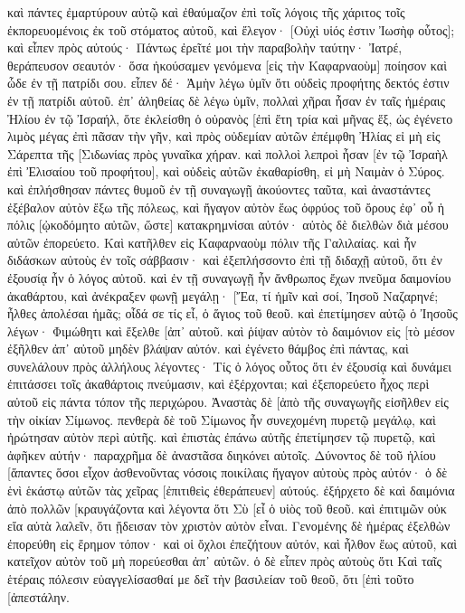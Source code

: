 καὶ πάντες ἐμαρτύρουν αὐτῷ καὶ ἐθαύμαζον ἐπὶ τοῖς λόγοις τῆς χάριτος τοῖς ἐκπορευομένοις ἐκ τοῦ στόματος αὐτοῦ, καὶ ἔλεγον· [Οὐχὶ υἱός ἐστιν Ἰωσὴφ οὗτος]; 
καὶ εἶπεν πρὸς αὐτούς· Πάντως ἐρεῖτέ μοι τὴν παραβολὴν ταύτην· Ἰατρέ, θεράπευσον σεαυτόν· ὅσα ἠκούσαμεν γενόμενα [εἰς τὴν Καφαρναοὺμ] ποίησον καὶ ὧδε ἐν τῇ πατρίδι σου. 
εἶπεν δέ· Ἀμὴν λέγω ὑμῖν ὅτι οὐδεὶς προφήτης δεκτός ἐστιν ἐν τῇ πατρίδι αὐτοῦ. 
ἐπ᾽ ἀληθείας δὲ λέγω ὑμῖν, πολλαὶ χῆραι ἦσαν ἐν ταῖς ἡμέραις Ἠλίου ἐν τῷ Ἰσραήλ, ὅτε ἐκλείσθη ὁ οὐρανὸς [ἐπὶ ἔτη τρία καὶ μῆνας ἕξ, ὡς ἐγένετο λιμὸς μέγας ἐπὶ πᾶσαν τὴν γῆν, 
καὶ πρὸς οὐδεμίαν αὐτῶν ἐπέμφθη Ἠλίας εἰ μὴ εἰς Σάρεπτα τῆς [Σιδωνίας πρὸς γυναῖκα χήραν. 
καὶ πολλοὶ λεπροὶ ἦσαν [ἐν τῷ Ἰσραὴλ ἐπὶ Ἐλισαίου τοῦ προφήτου], καὶ οὐδεὶς αὐτῶν ἐκαθαρίσθη, εἰ μὴ Ναιμὰν ὁ Σύρος. 
καὶ ἐπλήσθησαν πάντες θυμοῦ ἐν τῇ συναγωγῇ ἀκούοντες ταῦτα, 
καὶ ἀναστάντες ἐξέβαλον αὐτὸν ἔξω τῆς πόλεως, καὶ ἤγαγον αὐτὸν ἕως ὀφρύος τοῦ ὄρους ἐφ᾽ οὗ ἡ πόλις [ᾠκοδόμητο αὐτῶν, ὥστε] κατακρημνίσαι αὐτόν· 
αὐτὸς δὲ διελθὼν διὰ μέσου αὐτῶν ἐπορεύετο. 
Καὶ κατῆλθεν εἰς Καφαρναοὺμ πόλιν τῆς Γαλιλαίας. καὶ ἦν διδάσκων αὐτοὺς ἐν τοῖς σάββασιν· 
καὶ ἐξεπλήσσοντο ἐπὶ τῇ διδαχῇ αὐτοῦ, ὅτι ἐν ἐξουσίᾳ ἦν ὁ λόγος αὐτοῦ. 
καὶ ἐν τῇ συναγωγῇ ἦν ἄνθρωπος ἔχων πνεῦμα δαιμονίου ἀκαθάρτου, καὶ ἀνέκραξεν φωνῇ μεγάλῃ· 
[Ἔα, τί ἡμῖν καὶ σοί, Ἰησοῦ Ναζαρηνέ; ἦλθες ἀπολέσαι ἡμᾶς; οἶδά σε τίς εἶ, ὁ ἅγιος τοῦ θεοῦ. 
καὶ ἐπετίμησεν αὐτῷ ὁ Ἰησοῦς λέγων· Φιμώθητι καὶ ἔξελθε [ἀπ᾽ αὐτοῦ. καὶ ῥίψαν αὐτὸν τὸ δαιμόνιον εἰς [τὸ μέσον ἐξῆλθεν ἀπ᾽ αὐτοῦ μηδὲν βλάψαν αὐτόν. 
καὶ ἐγένετο θάμβος ἐπὶ πάντας, καὶ συνελάλουν πρὸς ἀλλήλους λέγοντες· Τίς ὁ λόγος οὗτος ὅτι ἐν ἐξουσίᾳ καὶ δυνάμει ἐπιτάσσει τοῖς ἀκαθάρτοις πνεύμασιν, καὶ ἐξέρχονται; 
καὶ ἐξεπορεύετο ἦχος περὶ αὐτοῦ εἰς πάντα τόπον τῆς περιχώρου. 
Ἀναστὰς δὲ [ἀπὸ τῆς συναγωγῆς εἰσῆλθεν εἰς τὴν οἰκίαν Σίμωνος. πενθερὰ δὲ τοῦ Σίμωνος ἦν συνεχομένη πυρετῷ μεγάλῳ, καὶ ἠρώτησαν αὐτὸν περὶ αὐτῆς. 
καὶ ἐπιστὰς ἐπάνω αὐτῆς ἐπετίμησεν τῷ πυρετῷ, καὶ ἀφῆκεν αὐτήν· παραχρῆμα δὲ ἀναστᾶσα διηκόνει αὐτοῖς. 
Δύνοντος δὲ τοῦ ἡλίου [ἅπαντες ὅσοι εἶχον ἀσθενοῦντας νόσοις ποικίλαις ἤγαγον αὐτοὺς πρὸς αὐτόν· ὁ δὲ ἑνὶ ἑκάστῳ αὐτῶν τὰς χεῖρας [ἐπιτιθεὶς ἐθεράπευεν] αὐτούς. 
ἐξήρχετο δὲ καὶ δαιμόνια ἀπὸ πολλῶν [κραυγάζοντα καὶ λέγοντα ὅτι Σὺ [εἶ ὁ υἱὸς τοῦ θεοῦ. καὶ ἐπιτιμῶν οὐκ εἴα αὐτὰ λαλεῖν, ὅτι ᾔδεισαν τὸν χριστὸν αὐτὸν εἶναι. 
Γενομένης δὲ ἡμέρας ἐξελθὼν ἐπορεύθη εἰς ἔρημον τόπον· καὶ οἱ ὄχλοι ἐπεζήτουν αὐτόν, καὶ ἦλθον ἕως αὐτοῦ, καὶ κατεῖχον αὐτὸν τοῦ μὴ πορεύεσθαι ἀπ᾽ αὐτῶν. 
ὁ δὲ εἶπεν πρὸς αὐτοὺς ὅτι Καὶ ταῖς ἑτέραις πόλεσιν εὐαγγελίσασθαί με δεῖ τὴν βασιλείαν τοῦ θεοῦ, ὅτι [ἐπὶ τοῦτο [ἀπεστάλην. 
